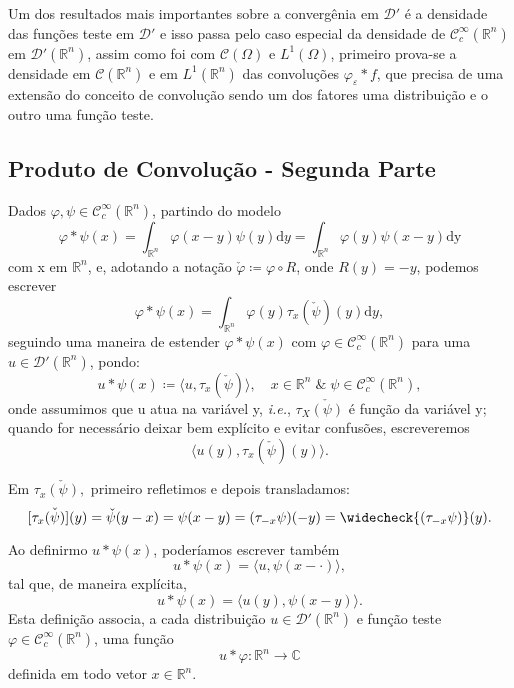 \documentclass[../distribution_theory_notes.tex]{subfiles}
\begin{document}
Um dos resultados mais importantes sobre a convergênia em \(\mathcal{D}'\) é a densidade das funções teste em \(\mathcal{D}'\) e isso passa pelo caso especial da densidade de \(\mathcal{C}_{c}^{\infty}(\mathbb{R}^{n})\) em \(\mathcal{D}'(\mathbb{R}^{n})\),
assim como foi com \(\mathcal{C}(\Omega )\) e \(L^{1}(\Omega )\), primeiro prova-se a densidade em \(\mathcal{C}(\mathbb{R}^{n})\) e em \(L^{1}(\mathbb{R}^{n})\) das convoluções \(\varphi_{\varepsilon }*f\), que precisa de uma extensão do conceito de convolução
sendo um dos fatores uma distribuição e o outro uma função teste.

\subsection{Produto de Convolução - Segunda Parte}

Dados \(\varphi , \psi \in \mathcal{C}_{c}^{\infty}(\mathbb{R}^{n})\), partindo do modelo
\[
	\varphi *\psi (x) = \int_{\mathbb{R}^{n}}^{}\varphi(x-y)\psi (y) \mathrm{d}y = \int_{\mathbb{R}^{n}}^{}\varphi(y)\psi (x-y) \mathrm{dy}
\]
com x em \(\mathbb{R}^{n}\), e, adotando a notação \(\check{\varphi }\coloneqq \varphi \circ R\), onde \(R(y) = -y\), podemos escrever
\[
	\varphi * \psi (x) = \int_{\mathbb{R}^{n}}^{}\varphi (y)\tau_{x}(\check{\psi} )(y) \mathrm{d}y,
\]
seguindo uma maneira de estender \(\varphi * \psi (x)\) com \(\varphi \in \mathcal{C}_{c}^{\infty}(\mathbb{R}^{n})\) para uma \(u\in \mathcal{D}'(\mathbb{R}^{n})\), pondo:
\[
	u*\psi (x)\coloneqq \langle u, \tau_{x}(\check{\psi} ) \rangle,\quad x\in \mathbb{R}^{n}\;\&\; \psi \in \mathcal{C}_{c}^{\infty}(\mathbb{R}^{n}),
\]
onde assumimos que u atua na variável y, \textit{i.e.}, \(\tau_{X}\check{(\psi )}\) é função da variável y; quando for necessário deixar bem explícito e evitar confusões, escreveremos
\[
	\langle u(y), \tau_{x}(\check{\psi} )(y) \rangle.
\]
\begin{tcolorbox}[
		skin=enhanced,
		title=Observação,
		fonttitle=\bfseries,
		colframe=black,
		colbacktitle=cyan!75!white,
		colback=cyan!15,
		colbacklower=black,
		coltitle=black,
		drop fuzzy shadow,
	]
	Em \(\tau_{x}\check{(\psi )},\) primeiro refletimos e depois transladamos:
	\[
		[\tau_{x}\check{(\psi )}](y) = \check{\psi}(y-x) = \psi(x-y) = (\tau_{-x}\psi )(-y) = \widecheck{(\tau_{-x}\psi )}(y).
	\]
\end{tcolorbox}
Ao definirmo \(u*\psi (x)\), poderíamos escrever também
\[
	u * \psi (x) = \langle u, \psi (x - \cdot ) \rangle,
\]
tal que, de maneira explícita,
\[
	u*\psi (x) = \langle u(y), \psi (x-y) \rangle.
\]
Esta definição associa, a cada distribuição \(u\in \mathcal{D}'(\mathbb{R}^{n})\) e função teste \(\varphi \in \mathcal{C}_{c}^{\infty}(\mathbb{R}^{n})\), uma função
\[
	u*\varphi :\mathbb{R}^{n}\rightarrow \mathbb{C}
\]
definida em todo vetor \(x\in \mathbb{R}^{n}\).
\end{document}
